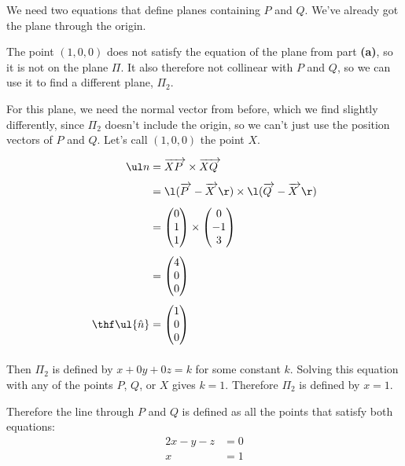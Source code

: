 \documentclass[a4paper]{article}
\begin{document}
We need two equations that define planes containing $P$ and $Q$. We've already got the plane through the origin.

The point $(1, 0, 0)$ does not satisfy the equation of the plane from part \textbf{(a)}, so it is not on the plane $\Pi$. It also therefore not collinear with $P$ and $Q$, so we can use it to find a different plane, $\Pi_2$.

For this plane, we need the normal vector from before, which we find slightly differently, since $\Pi_2$ doesn't include the origin, so we can't just use the position vectors of $P$ and $Q$. Let's call $(1, 0, 0)$ the point $X$.

\begin{align*}
\ul n &= \overrightarrow{XP\;} \times \overrightarrow{XQ\;}\\[1ex]
&= \l(\overrightarrow{P\;} - \overrightarrow{X\;}\r) \times \l(\overrightarrow{Q\;} - \overrightarrow{X\;}\r)\\[1ex]
&= \begin{pmatrix}0\\ 1\\ 1\end{pmatrix} \times \begin{pmatrix}0\\ -1\\ 3\end{pmatrix}\\[1ex]
&= \begin{pmatrix}4\\ 0\\ 0\end{pmatrix}\\[1ex]
\thf \ul{\hat n} &= \begin{pmatrix}1\\ 0\\ 0\end{pmatrix}\\[1ex]
\end{align*}

Then $\Pi_2$ is defined by $x + 0y + 0z = k$ for some constant $k$. Solving this equation with any of the points $P$, $Q$, or $X$ gives $k=1$. Therefore $\Pi_2$ is defined by $x=1$.

Therefore the line through $P$ and $Q$ is defined as all the points that satisfy both equations: \begin{align*} 2x - y - z &= 0\\
x &= 1
\end{align*}
\end{document}
